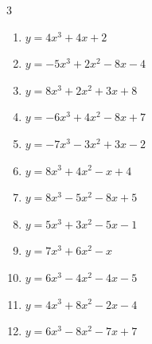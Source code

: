 \begin{multicols}{3}
\begin{enumerate}

\columnbreak %

\resetques

  \item $y=4x^{3}+4x+2$


  \item $y=-5x^{3}+2x^{2}-8x-4$


  \item $y=8x^{3}+2x^{2}+3x+8$


  \item $y=-6x^{3}+4x^{2}-8x+7$


  \item $y=-7x^{3}-3x^{2}+3x-2$


  \item $y=8x^{3}+4x^{2}-x+4$


  \item $y=8x^{3}-5x^{2}-8x+5$


  \item $y=5x^{3}+3x^{2}-5x-1$


  \item $y=7x^{3}+6x^{2}-x$


  \item $y=6x^{3}-4x^{2}-4x-5$


  \item $y=4x^{3}+8x^{2}-2x-4$


  \item $y=6x^{3}-8x^{2}-7x+7$


\end{enumerate}
\end{multicols}
